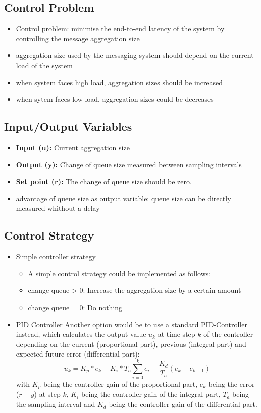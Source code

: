 \subsection{Control Problem}

\begin{itemize}
	\item Control problem: minimise the end-to-end latency of the system by controlling the message aggregation size
	\item aggregation size used by the messaging system should depend on the current load of the system
	\item when system faces high load, aggregation sizes should be increased
	\item when sytem faces low load, aggregation sizes could be decreases
\end{itemize}
\subsection{Input/Output Variables}

\begin{itemize}
	\item \textbf{Input (u):} Current aggregation size
	\item \textbf{Output (y):} Change of queue size measured between sampling intervals
	\item \textbf{Set point (r):} The change of queue size should be zero.
	\item advantage of queue size as output variable: queue size can be directly measured whithout a delay
\end{itemize}

\subsection{Control Strategy}

\begin{itemize}
	\item Simple controller strategy
	\begin{itemize}
		\item A simple control strategy could be implemented as follows:
		\item change queue > 0: Increase the aggregation size by a certain amount
		\item change queue = 0: Do nothing
	\end{itemize}
	\item PID Controller
	Another option would be to use a standard PID-Controller instead, which calculates the output value $u_k$ at time step $k$ of the controller depending on the current (proportional part), previous (integral part) and expected future error (differential part):
	\begin{displaymath}
	u_k=K_p*e_k+K_i*T_a\sum_{i=0}^k e_i+\frac{K_d}{T_a}(e_k-e_{k-1})
	\end{displaymath}
	with $K_p$ being the controller gain of the proportional part, $e_k$ being the error ($r-y$) at step $k$, $K_i$ being the controller gain of the integral part, $T_a$ being the sampling interval and $K_d$ being the controller gain of the differential part.
\end{itemize}

